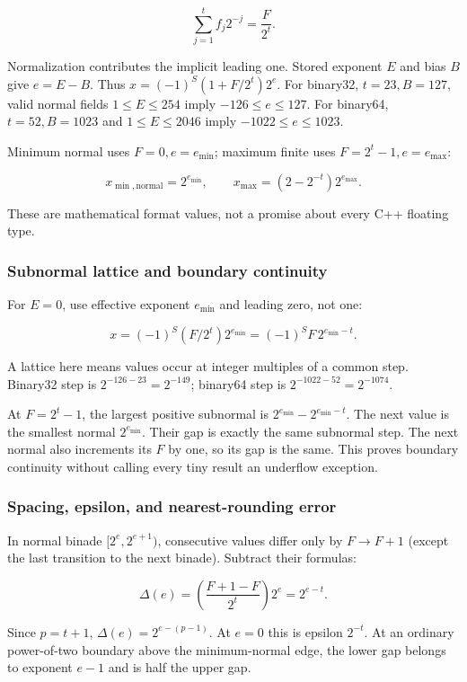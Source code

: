 \[
\sum_{j=1}^{t}f_j2^{-j}=\frac{F}{2^t}.
\]

Normalization contributes the implicit leading one. Stored exponent \(E\) and bias \(B\) give \(e=E-B\). Thus \(x=(-1)^S(1+F/2^t)2^e\). For binary32, \(t=23,B=127\), valid normal fields \(1\le E\le254\) imply \(-126\le e\le127\). For binary64, \(t=52,B=1023\) and \(1\le E\le2046\) imply \(-1022\le e\le1023\).

Minimum normal uses \(F=0,e=e_{\min}\); maximum finite uses \(F=2^t-1,e=e_{\max}\):

\[
x_{\min,\mathrm{normal}}=2^{e_{\min}},\qquad
x_{\max}=(2-2^{-t})2^{e_{\max}}.
\]

These are mathematical format values, not a promise about every C++ floating type.

\subsubsection{Subnormal lattice and boundary continuity}\label{subnormal-lattice-and-boundary-continuity}

For \(E=0\), use effective exponent \(e_{\min}\) and leading zero, not one:

\[
x=(-1)^S(F/2^t)2^{e_{\min}}=(-1)^S F\,2^{e_{\min}-t}.
\]

A lattice here means values occur at integer multiples of a common step. Binary32 step is \(2^{-126-23}=2^{-149}\); binary64 step is \(2^{-1022-52}=2^{-1074}\).

At \(F=2^t-1\), the largest positive subnormal is \(2^{e_{\min}}-2^{e_{\min}-t}\). The next value is the smallest normal \(2^{e_{\min}}\). Their gap is exactly the same subnormal step. The next normal also increments its \(F\) by one, so its gap is the same. This proves boundary continuity without calling every tiny result an underflow exception.

\subsubsection{Spacing, epsilon, and nearest-rounding error}\label{spacing-epsilon-and-nearest-rounding-error}

In normal binade \([2^e,2^{e+1})\), consecutive values differ only by \(F\to F+1\) (except the last transition to the next binade). Subtract their formulas:

\[
\Delta(e)=\left(\frac{F+1-F}{2^t}\right)2^e=2^{e-t}.
\]

Since \(p=t+1\), \(\Delta(e)=2^{e-(p-1)}\). At \(e=0\) this is epsilon \(2^{-t}\). At an ordinary power-of-two boundary above the minimum-normal edge, the lower gap belongs to exponent \(e-1\) and is half the upper gap.

